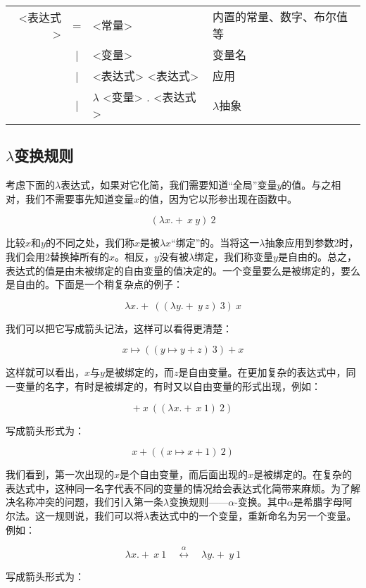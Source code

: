 \documentclass[UTF8]{article}
\begin{document}
\begin{tabular}{rcll}
<表达式> & = & <常量> & 内置的常量、数字、布尔值等 \\
        & | & <变量> & 变量名 \\
        & | & <表达式> <表达式> & 应用 \\
        & | & $\lambda$ <变量> . <表达式> & $\lambda$抽象
\end{tabular}

\subsection{$\lambda$变换规则}

考虑下面的$\lambda$表达式，如果对它化简，我们需要知道“全局”变量$y$的值。与之相对，我们不需要事先知道变量$x$的值，因为它以形参出现在函数中。

\[
(\lambda x . +\ x\ y)\ 2
\]

比较$x$和$y$的不同之处，我们称$x$是被$\lambda x$“绑定”的。当将这一$\lambda$抽象应用到参数2时，我们会用2替换掉所有的$x$。相反，$y$没有被$\lambda$绑定，我们称变量$y$是自由的。总之，表达式的值是由未被绑定的自由变量的值决定的。一个变量要么是被绑定的，要么是自由的。下面是一个稍复杂点的例子：

\[
\lambda x . +\ ((\lambda y . +\ y\ z)\ 3)\ x
\]

我们可以把它写成箭头记法，这样可以看得更清楚：

\[
x \mapsto ((y \mapsto y + z)\ 3) + x
\]

这样就可以看出，$x$与$y$是被绑定的，而$z$是自由变量。在更加复杂的表达式中，同一变量的名字，有时是被绑定的，有时又以自由变量的形式出现，例如：

\[
+\ x\ ((\lambda x . +\ x\ 1)\ 2)
\]

写成箭头形式为：

\[
x + ((x \mapsto x + 1)\ 2)
\]

 
我们看到，第一次出现的$x$是个自由变量，而后面出现的$x$是被绑定的。在复杂的表达式中，这种同一名字代表不同的变量的情况给会表达式化简带来麻烦。为了解决名称冲突的问题，我们引入第一条$\lambda$变换规则——$\alpha$-变换。其中$\alpha$是希腊字母阿尔法。这一规则说，我们可以将$\lambda$表达式中的一个变量，重新命名为另一个变量。例如：

\[
\lambda x . +\ x\ 1 \quad \overset{\alpha}{\longleftrightarrow} \quad \lambda y . +\ y\ 1
\]


写成箭头形式为：
\end{document}
